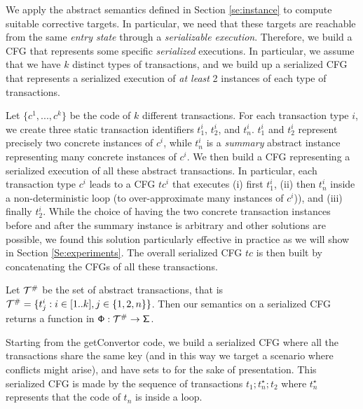 We apply the abstract semantics defined in Section \ref{se:instance} to compute suitable corrective targets. In particular, we need that these targets are reachable from the same \emph{entry state} through a \emph{serializable execution}. Therefore, we build a CFG that represents some specific \emph{serialized} executions. In particular, we assume that we have $k$ distinct types of transactions, and we build up a serialized CFG that represents a serialized execution of \emph{at least} 2 instances of each type of transactions.

Let $\{c^1, ..., c^k\}$ be the code of $k$ different transactions. For each transaction type $i$, we create three static transaction identifiers $t^i_1$, $t^i_2$, and $t^i_n$. $t^i_1$ and $t^i_2$ represent precisely two concrete instances of $c^i$, while $t^i_n$ is a \emph{summary} abstract instance representing many concrete instances of $c^i$. We then build a CFG representing a serialized execution of all these abstract transactions. In particular, each transaction type $c^i$ leads to a CFG $tc^i$ that executes (i) first $t^i_1$, (ii) then $t^i_n$ inside a non-deterministic loop (to over-approximate many instances of $c^i$)), and (iii) finally $t^i_2$. While the choice of having the two concrete transaction instances before and after the summary instance is arbitrary and other solutions are possible, we found this solution particularly effective in practice as we will show in Section \ref{Se:experiments}. The overall serialized CFG $tc$ is then built by concatenating the CFGs of all these transactions.

Let ${\cal T}^\#$ be the set of abstract transactions, that is ${\cal T}^\# = \{t^i_j : i \in [1..k], j \in \{1, 2, n\}\}$. Then our semantics on a serialized CFG returns a function in $\mathsf{\mathsf{\Phi}} : {\cal T}^\# \to \mathsf{\Sigma}$.


\runex
Starting from the \textsf{getConvertor} code, we build a serialized CFG where all the transactions share the same key  (and in this way we target a scenario where conflicts might arise), and have  sets to  for the sake of presentation. This serialized CFG is made by the sequence of transactions $t_1; t_n^\star; t_2$ where $t_n^\star$ represents that the code of $t_n$ is inside a loop.

